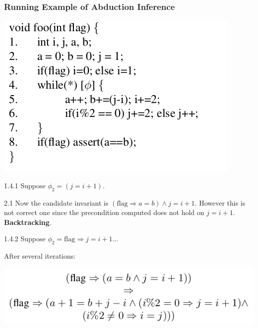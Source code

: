 \documentclass[11pt]{beamer}
\begin{document}
\begin{frame}\frametitle{Running Example of Abduction Inference}

\begin{center}

\includegraphics[scale=0.25]{exp.png}

\end{center}
1.4.1 Suppose $\phi_2 = (j = i + 1)$.

2.1 Now the candidate invariant is $(\text{flag}\Rightarrow a = b) \wedge j = i + 1$. However this is not correct one since the precondition computed does not hold on $j = i + 1$. \textbf{Backtracking}.

1.4.2 Suppose $\phi_2 = \text{flag}\Rightarrow  j = i + 1$...  

After several iterations: 

\begin{center}
\includegraphics[scale=0.4]{resultInv.png}
\end{center}
\end{frame}
\end{document}
